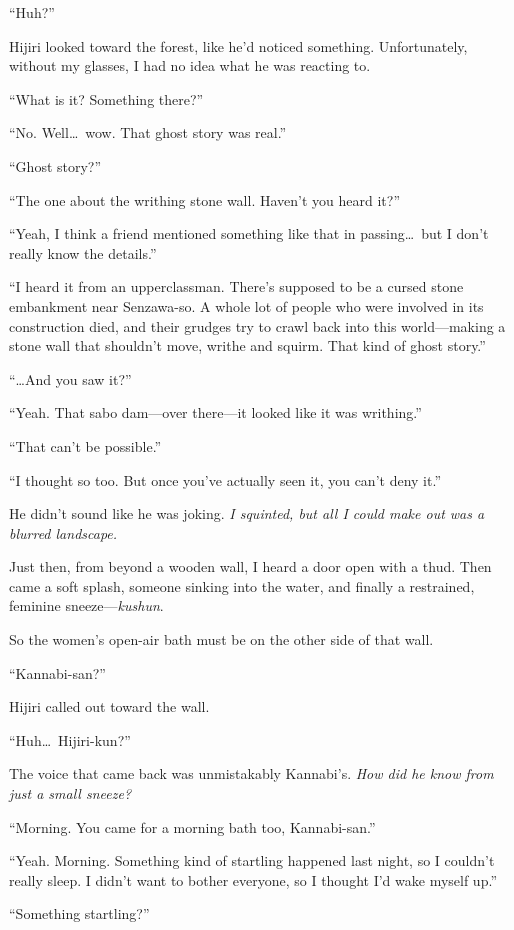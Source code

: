 \documentclass[
    a4paper,
    12pt,
    twoside,
    openany,
    UTF8,
    fontset=windows
]{ctexbook}
\begin{document}
``Huh?''

Hijiri looked toward the forest, like he'd noticed something. Unfortunately, without my glasses, I had no idea what he was reacting to.

``What is it? Something there?''

``No. Well\dots\ wow. That ghost story was real.''

``Ghost story?''

``The one about the writhing stone wall. Haven't you heard it?''

``Yeah, I think a friend mentioned something like that in passing\dots\ but I don't really know the details.''

``I heard it from an upperclassman. There's supposed to be a cursed stone embankment near Senzawa-so. A whole lot of people who were involved in its construction died, and their grudges try to crawl back into this world---making a stone wall that shouldn't move, writhe and squirm. That kind of ghost story.''

``\dots And you saw it?''

``Yeah. That sabo dam---over there---it looked like it was writhing.''

``That can't be possible.''

``I thought so too. But once you've actually seen it, you can't deny it.''

He didn't sound like he was joking. \textit{I squinted, but all I could make out was a blurred landscape.}

Just then, from beyond a wooden wall, I heard a door open with a thud. Then came a soft splash, someone sinking into the water, and finally a restrained, feminine sneeze---\textit{kushun}.

So the women's open-air bath must be on the other side of that wall.

``Kannabi-san?''

Hijiri called out toward the wall.

``Huh\dots\ Hijiri-kun?''

The voice that came back was unmistakably Kannabi's. \textit{How did he know from just a small sneeze?}

``Morning. You came for a morning bath too, Kannabi-san.''

``Yeah. Morning. Something kind of startling happened last night, so I couldn't really sleep. I didn't want to bother everyone, so I thought I'd wake myself up.''

``Something startling?''
\end{document}
